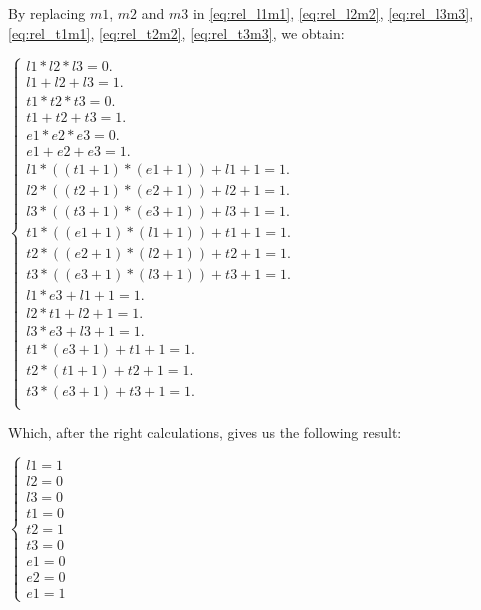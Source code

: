 By replacing $m1$, $m2$ and $m3$ in \ref{eq:rel_l1m1}, \ref{eq:rel_l2m2}, \ref{eq:rel_l3m3}, \ref{eq:rel_t1m1}, \ref{eq:rel_t2m2}, \ref{eq:rel_t3m3}, we obtain:

\begin{center}
\begin{math}
\begin{cases}
 l1 * l2 * l3  = 0.\\
l1 + l2 + l3  = 1.\\
t1 * t2 * t3  = 0.\\
t1 + t2 + t3  = 1.\\
e1 * e2 * e3  = 0.\\
e1 + e2 + e3  = 1.\\
l1 * ((t1 + 1) * (e1 + 1)) + l1 + 1 = 1.\\
l2 * ((t2 + 1) * (e2 + 1)) + l2 + 1 = 1.\\
l3 * ((t3 + 1) * (e3 + 1)) + l3 + 1 = 1.\\
t1 * ((e1 + 1) * (l1 + 1)) + t1 + 1 = 1.\\
t2 * ((e2 + 1) * (l2 + 1)) + t2 + 1 = 1.\\
t3 * ((e3 + 1) * (l3 + 1)) + t3 + 1 = 1.\\
l1 * e3 + l1 + 1 = 1.\\
l2 * t1 + l2 + 1 = 1.\\
l3 * e3 + l3 + 1 = 1.\\
t1 * (e3 + 1) + t1 + 1 = 1.\\
t2 * (t1 + 1) + t2 + 1 = 1.\\
t3 * (e3 + 1) + t3 + 1 = 1.\\
\end{cases}
\end{math} 
\end{center}


Which, after the right calculations,  gives us the following result:

\begin{center}
\begin{math}
\begin{cases}
 l1 = 1\\
 l2 = 0\\
 l3 = 0\\
 t1 = 0\\
 t2 = 1\\
 t3 = 0\\
 e1 = 0\\
 e2 = 0\\
 e1 = 1
\end{cases}
\end{math} 
\end{center}
